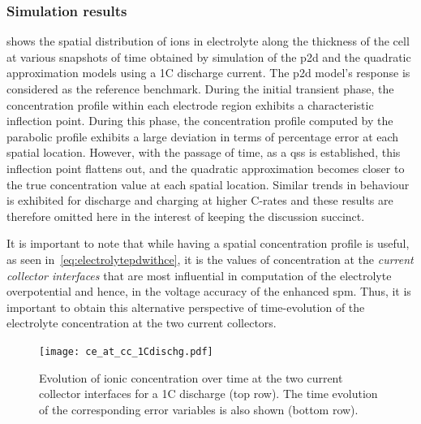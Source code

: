 \subsubsection*{Simulation results}\label{subsubsec:simresultsbaselinequad}
 shows  the spatial distribution of   ions
in electrolyte  along the  thickness of  the cell at  various snapshots  of time
obtained by simulation  of the \gls{p2d} and the  quadratic approximation models
using a  1C discharge current. The  \gls{p2d} model's response is  considered as
the reference benchmark.  During the initial transient  phase, the concentration
profile within each electrode region exhibits a characteristic inflection point.
During this phase,  the concentration profile computed by  the parabolic profile
exhibits  a  large deviation  in  terms  of  percentage  error at  each  spatial
location. However, with the passage of time, as a \gls{qss} is established, this
inflection point flattens out, and the quadratic approximation becomes closer to
the  true  concentration value  at  each  spatial  location. Similar  trends  in
behaviour is  exhibited for discharge and  charging at higher C-rates  and these
results are  therefore omitted here  in the  interest of keeping  the discussion
succinct.

It  is important  to  note that  while having  a  spatial concentration  profile
is  useful,  as  seen  in~\cref{eq:electrolytepdwithce}, it  is  the  values  of
concentration  at   the  \emph{current  collector  interfaces}   that  are  most
influential in  computation of the  electrolyte overpotential and hence,  in the
voltage accuracy of the enhanced \gls{spm}. Thus, it is important to obtain this
alternative perspective  of time-evolution  of the electrolyte  concentration at
the two current collectors.

\begin{figure}[!htbp]
    \centering
    \texttt{[image: ce\_at\_cc\_1Cdischg.pdf]}
    \caption[Ionic concentrations at current collector
    interfaces over time for 1C discharge]{Evolution of ionic concentration over
        time at the two current collector interfaces for a 1C discharge (top
        row). The time evolution of the corresponding error variables is also
    shown (bottom row).}
    \label{fig:temporalcequadratic}
\end{figure}

